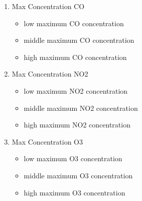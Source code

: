 \documentclass{classrep}
\begin{document}
{{\begin{enumerate}
\begin{figure}[!htbp]
                    \caption{}
                \end{figure}
                \FloatBarrier
                \item Max Concentration CO
                \begin{itemize}
                    \item low maximum CO concentration
                    \item middle maximum CO concentration
                    \item high maximum CO concentration
                \end{itemize}

                \item Max Concentration NO2
                \begin{itemize}
                    \item low maximum NO2 concentration
                    \item middle maximum NO2 concentration
                    \item high maximum NO2 concentration
                \end{itemize}

                \item Max Concentration O3
                \begin{itemize}
                    \item low maximum O3 concentration
                    \item middle maximum O3 concentration
                    \item high maximum O3 concentration
                \end{itemize}


\end{enumerate}}}
\end{document}
